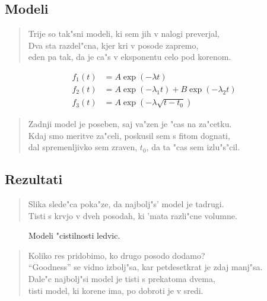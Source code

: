\documentclass[a4paper,10pt]{article}
\begin{document}
\subsection{Modeli}
\begin{verse}
 Trije so tak"sni modeli, ki sem jih v nalogi preverjal, \\
 Dva sta razdel"cna, kjer kri v posode zapremo, \\
 eden pa tak, da je ca"s v eksponentu celo pod korenom. 
\end{verse}

\begin{align}
 f_1(t) &= A \exp(-\lambda t) \\
 f_2(t) &= A \exp(-\lambda_1 t) + B \exp(-\lambda_2 t) \\
 f_3(t) &= A \exp(-\lambda \sqrt{t-t_0})
\end{align}

\begin{verse}
 Zadnji model je poseben, saj va"zen je "cas na za"cetku. \\
 Kdaj smo meritve za"celi, poskusil sem s fitom dognati, \\
 dal spremenljivko sem zraven, $t_0$, da ta "cas sem izlu"s"cil. 
\end{verse}

\subsection{Rezultati}

\begin{verse}
 Slika slede"ca poka"ze, da najbolj"s' model je tadrugi. \\
 Tisti s krvjo v dveh posodah, ki 'mata razli"cne volumne. \\
\end{verse}

\begin{figure}[h]
 
  \caption{Modeli "cistilnosti ledvic. }
  \label{fig:ledvice}
\end{figure}

\begin{verse}
 Koliko res pridobimo, ko drugo posodo dodamo? \\
 ``Goodness'' se vidno izbolj"sa, kar petdesetkrat je zdaj manj"sa. \\
 Dale"c najbolj"si model je tisti s prekatoma dvema, \\
 tisti model, ki korene ima, po dobroti je v sredi. 
\end{verse}
\end{document}
